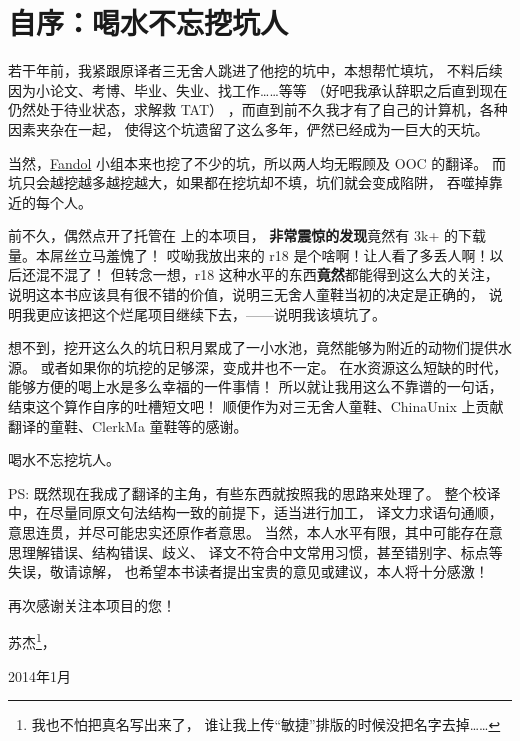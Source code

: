 


\chapter{自序：喝水不忘挖坑人}
\label{ch:ownPreface}

若干年前，我紧跟原译者三无舍人跳进了他挖的坑中，本想帮忙填坑，
不料后续因为小论文、考博、毕业、失业、找工作……等等%
（好吧我承认辞职之后直到现在仍然处于待业状态，求解救 TAT）%
，而直到前不久我才有了自己的计算机，各种因素夹杂在一起，
使得这个坑遗留了这么多年，俨然已经成为一巨大的天坑。

当然，\href{http://fandol.github.io}{Fandol}
小组本来也挖了不少的坑，所以两人均无暇顾及 OOC 的翻译。
而坑只会越挖越多越挖越大，如果都在挖坑却不填，坑们就会变成陷阱，
吞噬掉靠近的每个人。

前不久，偶然点开了托管在
 上的本项目，
\textbf{非常震惊的发现}竟然有 3k+ 的下载量。本屌丝立马羞愧了！
哎呦我放出来的 r18 是个啥啊！让人看了多丢人啊！以后还混不混了！
但转念一想，r18 这种水平的东西\textbf{竟然}都能得到这么大的关注，
说明这本书应该具有很不错的价值，说明三无舍人童鞋当初的决定是正确的，
说明我更应该把这个烂尾项目继续下去，——说明我该填坑了。

想不到，挖开这么久的坑日积月累成了一小水池，竟然能够为附近的动物们提供水源。
或者如果你的坑挖的足够深，变成井也不一定。
在水资源这么短缺的时代，能够方便的喝上水是多么幸福的一件事情！
所以就让我用这么不靠谱的一句话，结束这个算作自序的吐槽短文吧！
顺便作为对三无舍人童鞋、ChinaUnix 上贡献翻译的童鞋、ClerkMa 童鞋等的感谢。

喝水不忘挖坑人。

\bigskip
PS: 既然现在我成了翻译的主角，有些东西就按照我的思路来处理了。
整个校译中，在尽量同原文句法结构一致的前提下，适当进行加工，
译文力求语句通顺，意思连贯，并尽可能忠实还原作者意思。
当然，本人水平有限，其中可能存在意思理解错误、结构错误、歧义、
译文不符合中文常用习惯，甚至错别字、标点等失误，敬请谅解，
也希望本书读者提出宝贵的意见或建议，本人将十分感激！

再次感谢关注本项目的您！

\begin{flushright}
    苏杰\footnote{我也不怕把真名写出来了，
        谁让我上传“敏捷”排版的时候没把名字去掉……}，

    2014年1月
\end{flushright}
\newpage{\thispagestyle{empty}\cleardoublepage}


